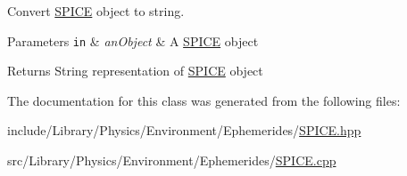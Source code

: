 Convert \hyperlink{classlibrary_1_1physics_1_1env_1_1ephem_1_1_s_p_i_c_e}{S\+P\+I\+CE} object to string. 


\begin{DoxyParams}[1]{Parameters}
\mbox{\tt in}  & {\em an\+Object} & A \hyperlink{classlibrary_1_1physics_1_1env_1_1ephem_1_1_s_p_i_c_e}{S\+P\+I\+CE} object \\
\hline
\end{DoxyParams}
\begin{DoxyReturn}{Returns}
String representation of \hyperlink{classlibrary_1_1physics_1_1env_1_1ephem_1_1_s_p_i_c_e}{S\+P\+I\+CE} object 
\end{DoxyReturn}


The documentation for this class was generated from the following files\+:\begin{DoxyCompactItemize}
\item 
include/\+Library/\+Physics/\+Environment/\+Ephemerides/\hyperlink{_s_p_i_c_e_8hpp}{S\+P\+I\+C\+E.\+hpp}\item 
src/\+Library/\+Physics/\+Environment/\+Ephemerides/\hyperlink{_s_p_i_c_e_8cpp}{S\+P\+I\+C\+E.\+cpp}\end{DoxyCompactItemize}
